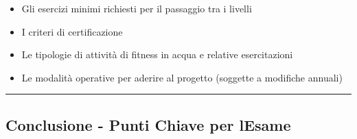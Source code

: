 \documentclass[a4paper,11pt]{article}
\providecommand{\tightlist}{%
  \setlength{\itemsep}{0pt}\setlength{\parskip}{0pt}}
\begin{document}
\begin{itemize}
      \tightlist
      \item
            Gli esercizi minimi richiesti per il passaggio tra i livelli
      \item
            I criteri di certificazione
      \item
            Le tipologie di attività di fitness in acqua e relative esercitazioni
      \item
            Le modalità operative per aderire al progetto (soggette a modifiche
            annuali)
\end{itemize}

\begin{center}\rule{0.5\linewidth}{0.5pt}\end{center}

\subsection{Conclusione - Punti Chiave per
      l\textquotesingle Esame}\label{conclusione---punti-chiave-per-lesame-14}
\end{document}

